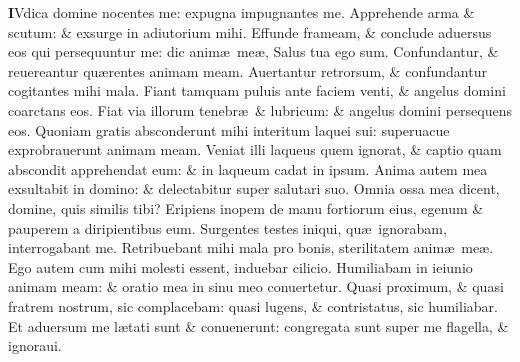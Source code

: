 \documentclass[a5paper,10pt]{book}
\def\ae{æ}
\begin{document}
\begin{multicols*}{2}
\lettrine[lines=2]{\bfseries \color{red} I}{}Vdica domine nocentes me: expugna impugnantes me.
\newline \color{red} A\color{black}pprehende arma \& scutum: \& exsurge in adiutorium mihi.
\newline \color{red} E\color{black}ffunde frameam, \& conclude aduersus eos qui persequuntur me: dic anim\ae \ me\ae , Salus tua ego sum.
\newline \color{red} C\color{black}onfundantur, \& reuereantur qu\ae rentes animam meam.
\newline \color{red} A\color{black}uertantur retrorsum, \& confundantur cogitantes mihi mala.
\newline \color{red} F\color{black}iant tamquam puluis ante faciem venti, \& angelus domini coarctans eos.
\newline \color{red} F\color{black}iat via illorum tenebr\ae \ \& lubricum: \& angelus domini persequens eos.
\newline \color{red} Q\color{black}uoniam gratis absconderunt mihi interitum laquei sui: superuacue exprobrauerunt animam meam.
\newline \color{red} V\color{black}eniat illi laqueus quem ignorat, \& captio quam abscondit apprehendat eum: \& in laqueum cadat in ipsum.
\newline \color{red} A\color{black}nima autem mea exsultabit in domino: \& delectabitur super salutari suo.
\newline \color{red} O\color{black}mnia ossa mea dicent, domine, quis similis tibi?
\newline \color{red} E\color{black}ripiens inopem de manu fortiorum eius, egenum \& pauperem a diripientibus eum.
\newline \color{red} S\color{black}urgentes testes iniqui, qu\ae \ ignorabam, interrogabant me.
\newline \color{red} R\color{black}etribuebant mihi mala pro bonis, sterilitatem anim\ae \ me\ae .
\newline \color{red} E\color{black}go autem cum mihi molesti essent, induebar cilicio.
\newline \color{red} H\color{black}umiliabam in ieiunio animam meam: \& oratio mea in sinu meo conuertetur.
\newline \color{red} Q\color{black}uasi proximum, \& quasi fratrem nostrum, sic complacebam: quasi lugens, \& contristatus, sic humiliabar.
\newline \color{red} E\color{black}t aduersum me l\ae tati sunt \& conuenerunt: congregata sunt super me flagella, \& ignoraui.

\end{multicols*}
\end{document}
